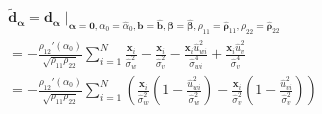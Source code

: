 \documentclass[aap,authoryear, preprint]{imsart}
\numberwithin{equation}{section}
\theoremstyle{plain}
\begin{document}
\begin{equation}
    \begin{multlined}
    \bm{\tilde{d}}_{\bm{\alpha}} = \bm{d}_{\bm{\alpha}}\mid_{\bm{\alpha}=\bm{0}, \alpha_0 = \hat{\alpha}_0, \bm{b} = \bm{\hat{b}},\bm{\beta} = \bm{\hat{\beta}}, {\rho}_{11} = {\bm{\hat{\rho}}_{11}},
    {\rho}_{22} = {\bm{\hat{\rho}}_{22}}}\\
    = -\frac{\rho_{12}'(\alpha_0)}{\sqrt{\rho_{11}\rho_{22}}} \sum_{i=1}^{N} \frac{\bm{x}_i}{\hat{\sigma}_{w}^2} - \frac{\bm{x}_i}{\hat{\sigma}_{v}^2} - \frac{\bm{x}_i \hat{u}_{wi}^2}{\hat{\sigma}_{wi}^4} + \frac{\bm{x}_i \hat{u}_{v}^2}{\hat{\sigma}_{v}^4}\\
    = -\frac{\rho_{12}'(\alpha_0)}{\sqrt{\rho_{11}\rho_{22}}} \sum_{i=1}^{N} \left(
    \frac{\bm{x}_i}{\hat{\sigma}_{w}^2}
    \left( 1-\frac{\hat{u}_{wi}^2}{\hat{\sigma}_{w}^2}\right) - 
    \frac{\bm{x}_i}{\hat{\sigma}_{v}^2}
    \left( 1-\frac{\hat{u}_{vi}^2}{\hat{\sigma}_{v}^2}\right) 
    \right)
    \end{multlined}
\end{equation}

\end{document}

